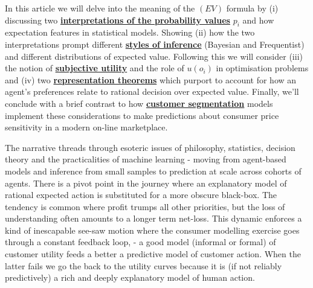 \documentclass{tufte-handout}
\begin{document}
\noindent
In this article we will delve into the meaning of the $(EV)$ formula by (i) discussing two \hyperref[sec:Probability]{\textbf{interpretations of the probability values}} $p_{i}$ and how expectation features in statistical models. Showing (ii) how the two interpretations prompt different \hyperref[sec:Inference]{\textbf{styles of inference}} (Bayesian and Frequentist) and different distributions of expected value. Following this we will consider (iii) the notion of \hyperref[sec:Utility]{\textbf{subjective utility}} and the role of $u(o_{i})$ in optimisation problems and (iv) two \hyperref[sec:Representation]{\textbf{representation theorems}} which purport to account for how an agent's preferences relate to rational decision over expected value. Finally, we'll conclude with a brief contrast to how \hyperref[sec:Segmentation]{\textbf{customer segmentation}} models implement these considerations to make predictions about consumer price sensitivity in a modern on-line marketplace. 
\linebreak

\noindent The narrative threads through esoteric issues of philosophy, statistics, decision theory and the practicalities of machine learning - moving from agent-based models and inference from small samples to prediction at scale across cohorts of agents. There is a pivot point in the journey where an explanatory model of rational expected action is substituted for a more obscure black-box. The tendency is common where profit trumps all other priorities, but the loss of understanding often amounts to a longer term net-loss. This dynamic enforces a kind of inescapable see-saw motion where the consumer modelling exercise goes through a constant feedback loop, - a good model (informal or formal) of customer utility feeds a better a predictive model of customer action. When the latter fails we go the back to the utility curves because it is (if not reliably predictively) a rich and deeply explanatory model of human action. 
\end{document}

